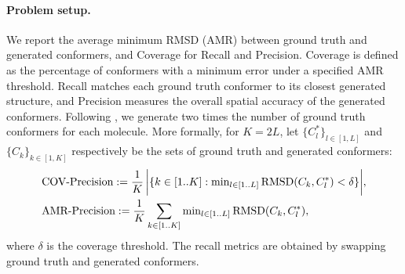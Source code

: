 \paragraph{Problem setup.}
We report the average minimum RMSD (AMR) between ground truth and generated conformers, and Coverage for Recall and Precision. Coverage is defined as the percentage of conformers with a minimum error under a specified AMR threshold. Recall matches each ground truth conformer to its closest generated structure, and Precision measures the overall spatial accuracy of the generated conformers.
Following \citet{torsional-diffusion}, we generate two times the number of ground truth conformers for each molecule. More formally, for $K=2L$, let $\{C^*_l\}_{l \in [1, L]}$ and $\{C_k\}_{k \in [1, K]}$ respectively be the sets of ground truth and generated conformers:
\begin{equation}
\begin{aligned}
&\text{COV-Precision} := \frac{1}{K}\, \bigg\lvert\{ k \in [1..K]: \text{min}_{ l\in [1..L]} \operatorname{RMSD}(C_k, C^*_l) < \delta \} \bigg\rvert,\\
&\text{AMR-Precision} := \frac{1}{K} \sum_{k \in [1..K]}  \text{min}_{ l\in [1..L]} \operatorname{RMSD}(C_k, C^*_l),\\
\end{aligned}
\label{eq:amr}
\end{equation}
where $\delta$ is the coverage threshold. The recall metrics are obtained by swapping ground truth and generated conformers. 
